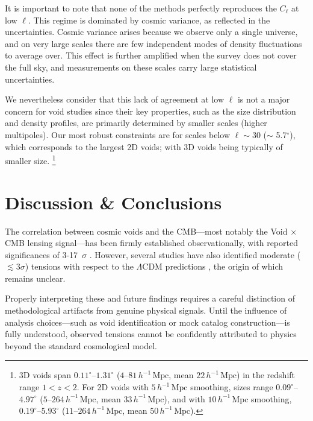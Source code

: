 \documentclass[]{aa} %
\begin{document}
It is important to note that none of the methods perfectly reproduces the $C_\ell$ at low $\ell$. This regime is dominated by cosmic variance, as reflected in the uncertainties. Cosmic variance arises because we observe only a single universe, and on very large scales there are few independent modes of density fluctuations to average over. This effect is further amplified when the survey does not cover the full sky, and measurements on these scales carry large statistical uncertainties. 

We nevertheless consider that this lack of agreement at low $\ell$ is not a major concern for void studies since their key properties, such as the size distribution and density profiles, are primarily determined by smaller scales (higher multipoles). Our most robust constraints are for scales below $\ell \sim 30 $ ($\sim$ 5.7$^\circ$), which corresponds to the largest 2D voids; with 3D voids being typically of smaller size. \footnote{3D voids span $0.11^\circ$–$1.31^\circ$ ($4$–$81\,h^{-1}\,\mathrm{Mpc}$, mean $22\,h^{-1}\,\mathrm{Mpc}$) in the redshift range $1<z<2$. For 2D voids with $5\,h^{-1}\,\mathrm{Mpc}$ smoothing, sizes range $0.09^\circ$–$4.97^\circ$ ($5$–$264\,h^{-1}\,\mathrm{Mpc}$, mean $33\,h^{-1}\,\mathrm{Mpc}$), and with $10\,h^{-1}\,\mathrm{Mpc}$ smoothing, $0.19^\circ$–$5.93^\circ$ ($11$–$264\,h^{-1}\,\mathrm{Mpc}$, mean $50\,h^{-1}\,\mathrm{Mpc}$).}


\section{Discussion \& Conclusions}
\label{sec:conclusions}

The correlation between cosmic voids and the CMB---most notably the Void $\times$ CMB lensing signal---has been firmly established observationally, with reported significances of 3-17~$\sigma$ \citep{cai2017cmbk_isw, chantavat2016cmbk, raghunathan2020cmbk, vielzeuf2021DESY1cmbk, hang2021cmbk_isw, kovacs2022DESY3cmbk, camachociurana2024cmbk, demirbozan2024cmbk, sartori2024cmbk}. However, several studies have also identified moderate ($\lesssim3\sigma$) tensions with respect to the $\Lambda$CDM predictions \citep{vielzeuf2021DESY1cmbk, hang2021cmbk_isw, kovacs2022DESY3cmbk, camachociurana2024cmbk}, the origin of which remains unclear. 

Properly interpreting these and future findings requires a careful distinction of methodological artifacts from genuine physical signals. Until the influence of analysis choices---such as void identification or mock catalog construction---is fully understood, observed tensions cannot be confidently attributed to physics beyond the standard cosmological model.
\end{document}
